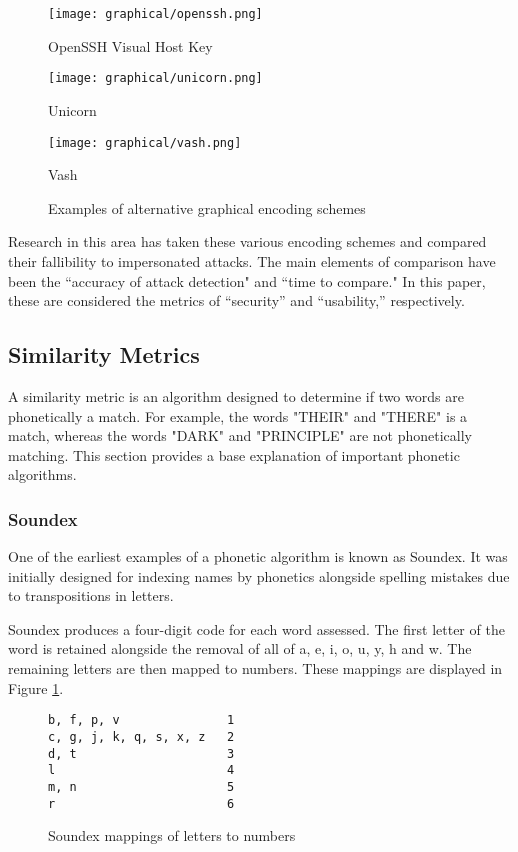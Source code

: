 \begin{figure}[h!]
    \centering
        \texttt{[image: graphical/openssh.png]}
        \caption{OpenSSH Visual Host Key}
    \endminipage
        \texttt{[image: graphical/unicorn.png]}
        \caption{Unicorn}
    \endminipage
        \texttt{[image: graphical/vash.png]}
        \caption{Vash}
    \endminipage
    \caption{Examples of alternative graphical encoding schemes}
\end{figure}

Research in this area has taken these various encoding schemes and compared their fallibility to impersonated attacks. The main elements of comparison have been the ``accuracy of attack detection" and ``time to compare." In this paper, these are considered the metrics of ``security'' and ``usability,'' respectively.

\subsection{Similarity Metrics}
\label{sec:similarity_metric}
A similarity metric is an algorithm designed to determine if two words are phonetically a match. For example, the words "THEIR" and "THERE" is a match, whereas the words "DARK" and "PRINCIPLE" are not phonetically matching. This section provides a base explanation of important phonetic algorithms.

\subsubsection*{Soundex}
\label{sec:soundex}
One of the earliest examples of a phonetic algorithm is known as Soundex. It was initially designed for indexing names by phonetics alongside spelling mistakes due to transpositions in letters. 

Soundex produces a four-digit code for each word assessed.
The first letter of the word is retained alongside the removal of all of a, e, i, o, u, y, h and w. The remaining letters are then mapped to numbers. These mappings are displayed in Figure \ref{fig:soundexMap}.

\begin{figure}[h!]
    \centering
    \begin{BVerbatim}
b, f, p, v               1
c, g, j, k, q, s, x, z   2
d, t                     3
l                        4
m, n                     5
r                        6
    \end{BVerbatim}

    \caption{Soundex mappings of letters to numbers}
    \label{fig:soundexMap}
\end{figure}

